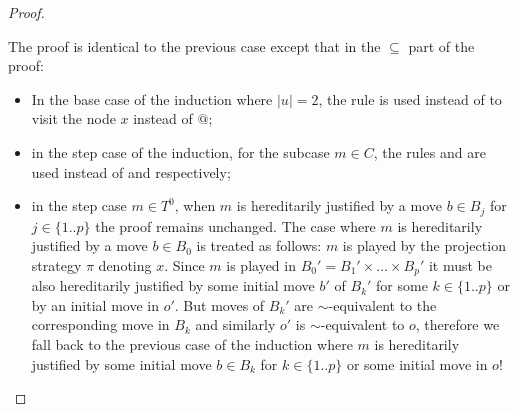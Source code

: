 \begin{proof}
\begin{enumerate}[$\bullet$]
    The proof is identical to the previous case except that in the $\subseteq$ part of the proof:
    \begin{itemize}
        \item In the base case of the induction where $|u|=2$,
        the rule  is used instead of  to visit the node $x$ instead of $@$;
        \item in the step case of the induction, for the subcase $m\in C$, the rules  and  are used instead of  and  respectively;
        \item in the step case $m\in T^0$, when $m$ is hereditarily justified by a move $b \in B_j$ for
         $j\in \{1 .. p\}$ the proof remains unchanged. The case where $m$ is hereditarily justified by a move $b \in B_0$ is treated as follows: $m$ is played by the projection strategy $\pi$ denoting $x$.
         Since $m$ is played in $B_0' = B_1' \times \ldots \times B_p'$ it must be also hereditarily justified by some initial move $b'$ of $B_k'$ for some $k \in \{1.. p\}$ or by an initial move in $o'$. But moves of $B_k'$ are $\sim$-equivalent to the corresponding move in $B_k$ and similarly $o'$ is $\sim$-equivalent to $o$, therefore we fall back to the previous case of the induction where $m$ is hereditarily justified by some initial move $b\in B_k$ for $k\in \{1..p\}$ or some initial move in $o$!
    \end{itemize}


\end{enumerate}


\end{proof}


